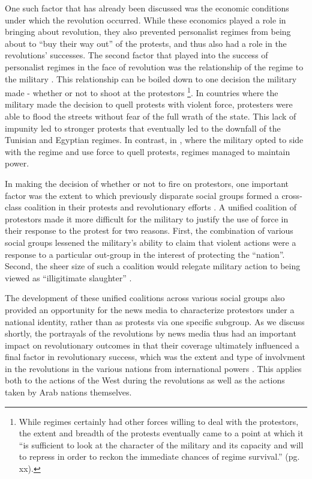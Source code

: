 One such factor that has already been discussed was the economic conditions under which the revolution occurred. While these economics played a role in bringing about revolution, they also prevented personalist regimes from being about to ``buy their way out'' of the protests, and thus also had a role in the revolutions' successes. The second factor that played into the success of personalist regimes in the face of revolution was the relationship of the regime to the military \cite{comunello_will_2012,battera_perspectives_2014}.  This relationship can be boiled down to one decision the military made - whether or not to shoot at the protestors \cite{bellin_reconsidering_2012}\footnote{While regimes certainly had other forces willing to deal with the protestors, the extent and breadth of the protests eventually came to a point at which it ``is sufficient to look at the character of the military and its capacity and will to repress in order to reckon the immediate chances of regime survival.'' \cite{bellin_reconsidering_2012}(pg. xx).}.  In countries where the military made the decision to quell protests with violent force, protesters were able to flood the streets without fear of the full wrath of the state. This lack of impunity led to stronger protests that eventually led to the downfall of the Tunisian and Egyptian regimes.  In contrast, in , where the military opted to side with the regime and use force to quell protests, regimes managed to maintain power.

In making the decision of whether or not to fire on protestors, one important factor was  the extent to which previously disparate social groups formed a cross-class coalition  in their protests and revolutionary efforts \cite{goldstone_cross-class_2011} .  A unified coalition of protestors made it more difficult for the military to justify the use of force in their response to the protest for two reasons. First, the combination of various social groups lessened the military's ability to claim that violent actions were a response to a particular out-group in the interest of protecting the ``nation''.  Second, the sheer size of such a coalition would relegate military action to being viewed as ``illigitimate slaughter'' \cite{bellin_reconsidering_2012}.  

The development of these unified coalitions across various social groups also provided an opportunity for the news media to characterize protestors under a national identity, rather than as protests via one specific subgroup.  As we discuss shortly, the portrayals of the revolutions by news media thus had an important impact on revolutionary outcomes in that their coverage ultimately influenced a final factor in revolutionary success, which was the extent and type of involvment in the revolutions in the various nations from international powers \cite{goldstone_bringing_2013,comunello_will_2012}.  This applies both to the actions of the West during the revolutions as well as the actions taken by Arab nations themselves.  

